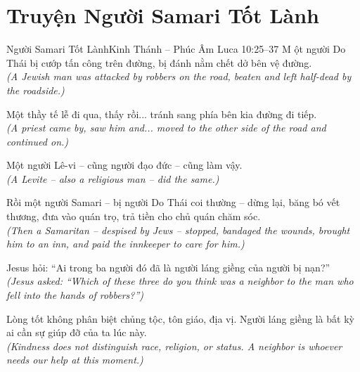 \section{Truyện Người Samari Tốt Lành}
\begin{truyen}{Người Samari Tốt Lành}{Kinh Thánh -- Phúc Âm Luca 10:25--37}
M ột người Do Thái bị cướp tấn công trên đường, bị đánh nằm chết dở bên vệ đường.\\
\textit{(A Jewish man was attacked by robbers on the road, beaten and left half-dead by the roadside.)}

Một thầy tế lễ đi qua, thấy rồi... tránh sang phía bên kia đường đi tiếp.\\
\textit{(A priest came by, saw him and... moved to the other side of the road and continued on.)}

Một người Lê-vi -- cũng người đạo đức -- cũng làm vậy.\\
\textit{(A Levite -- also a religious man -- did the same.)}

Rồi một người Samari -- bị người Do Thái coi thường -- dừng lại, băng bó vết thương, đưa vào quán trọ, trả tiền cho chủ quán chăm sóc.\\
\textit{(Then a Samaritan -- despised by Jews -- stopped, bandaged the wounds, brought him to an inn, and paid the innkeeper to care for him.)}

Jesus hỏi: ``Ai trong ba người đó đã là người láng giềng của người bị nạn?''\\
\textit{(Jesus asked: ``Which of these three do you think was a neighbor to the man who fell into the hands of robbers?'')}

\end{truyen}
\begin{baihoc}
  Lòng tốt không phân biệt chủng tộc, tôn giáo, địa vị. Người láng giềng là bất kỳ ai cần sự giúp đỡ của ta lúc này.\\
  \textit{(Kindness does not distinguish race, religion, or status. A neighbor is whoever needs our help at this moment.)}
\end{baihoc}

